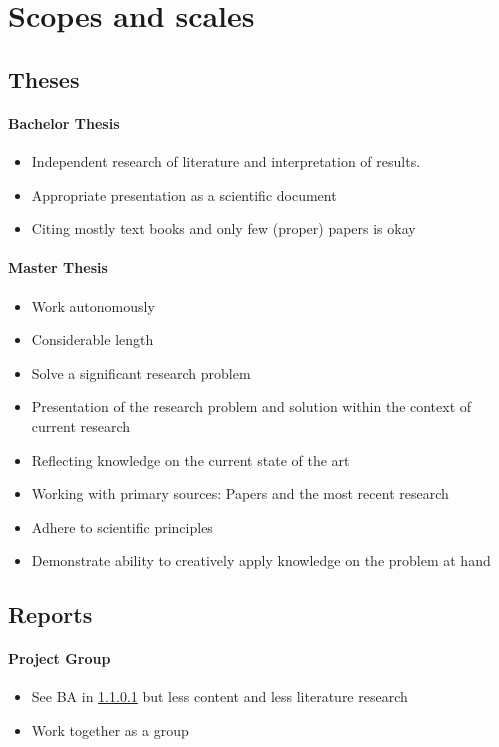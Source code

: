 \documentclass[twocolumn]{mlai-guide}
\begin{document}
\section{Scopes and scales}

\subsection{Theses}

\paragraph{Bachelor Thesis} \label{Scope BA}
\begin{itemize}
	\item Independent research of literature and interpretation of results. 
	\item Appropriate presentation as a scientific document
	\item Citing mostly text books and only few (proper) papers is okay
\end{itemize}

\paragraph{Master Thesis} \label{Scope MA}
\begin{itemize}
	\item Work autonomously
	\item Considerable length
	\item Solve a significant research problem
	\item Presentation of the research problem and solution within the context of current research
	\item Reflecting knowledge on the current state of the art
	\item Working with primary sources: Papers and the most recent research
	\item Adhere to scientific principles
	\item Demonstrate ability to creatively apply knowledge on the problem at hand
\end{itemize}

\subsection{Reports}

\paragraph{Project Group}
	\begin{itemize}
		\item See BA in \ref{Scope BA} but less content and less literature research
		\item Work together as a group
	\end{itemize}
\end{document}
